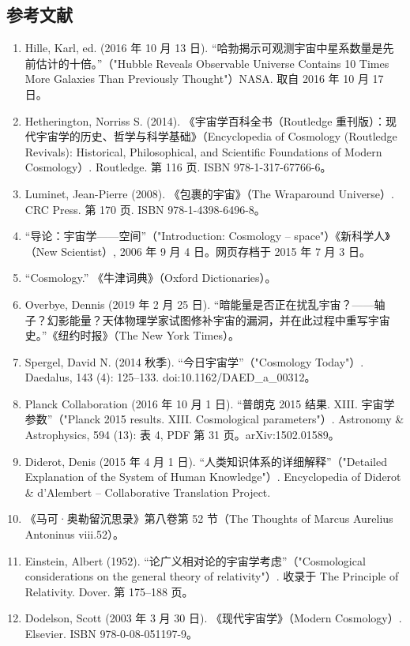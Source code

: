 \subsection{参考文献}
\begin{enumerate}
\item Hille, Karl, ed. (2016 年 10 月 13 日). “哈勃揭示可观测宇宙中星系数量是先前估计的十倍。”（"Hubble Reveals Observable Universe Contains 10 Times More Galaxies Than Previously Thought"）NASA. 取自 2016 年 10 月 17 日。  
\item Hetherington, Norriss S. (2014). 《宇宙学百科全书（Routledge 重刊版）：现代宇宙学的历史、哲学与科学基础》（Encyclopedia of Cosmology (Routledge Revivals): Historical, Philosophical, and Scientific Foundations of Modern Cosmology）. Routledge. 第 116 页. ISBN 978-1-317-67766-6。  
\item Luminet, Jean-Pierre (2008). 《包裹的宇宙》（The Wraparound Universe）. CRC Press. 第 170 页. ISBN 978-1-4398-6496-8。  
\item “导论：宇宙学——空间”（"Introduction: Cosmology – space"）《新科学人》（New Scientist）, 2006 年 9 月 4 日。网页存档于 2015 年 7 月 3 日。  
\item “Cosmology.” 《牛津词典》（Oxford Dictionaries）。  
\item Overbye, Dennis (2019 年 2 月 25 日). “暗能量是否正在扰乱宇宙？——轴子？幻影能量？天体物理学家试图修补宇宙的漏洞，并在此过程中重写宇宙史。”《纽约时报》（The New York Times）。  
\item Spergel, David N. (2014 秋季). “今日宇宙学”（"Cosmology Today"）. Daedalus, 143 (4): 125–133. doi:10.1162/DAED_a_00312。  
\item Planck Collaboration (2016 年 10 月 1 日). “普朗克 2015 结果. XIII. 宇宙学参数”（"Planck 2015 results. XIII. Cosmological parameters"）. Astronomy & Astrophysics, 594 (13): 表 4, PDF 第 31 页。arXiv:1502.01589。  
\item Diderot, Denis (2015 年 4 月 1 日). “人类知识体系的详细解释”（"Detailed Explanation of the System of Human Knowledge"）. Encyclopedia of Diderot & d'Alembert – Collaborative Translation Project.  
\item 《马可·奥勒留沉思录》第八卷第 52 节（The Thoughts of Marcus Aurelius Antoninus viii.52）。  
\item Einstein, Albert (1952). “论广义相对论的宇宙学考虑”（"Cosmological considerations on the general theory of relativity"）. 收录于 The Principle of Relativity. Dover. 第 175–188 页。  
\item Dodelson, Scott (2003 年 3 月 30 日). 《现代宇宙学》（Modern Cosmology）. Elsevier. ISBN 978-0-08-051197-9。  

\end{enumerate}
